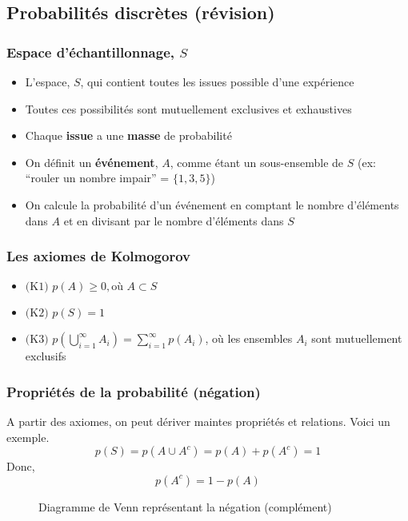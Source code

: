 \documentclass{beamer}
\begin{document}
\subsection{Probabilités discrètes (révision)}

\begin{frame}
    \frametitle{Espace d'échantillonnage, $S$}
    \begin{itemize}
      \item L'espace, $S$, qui contient toutes les issues possible d'une expérience
      \pause
      \item Toutes ces possibilités sont mutuellement exclusives et exhaustives
      \pause
      \item Chaque \textbf{issue} a une \textbf{masse} de probabilité
      \pause
      \item On définit un \textbf{événement}, $A$, comme étant un sous-ensemble de $S$ (ex: ``rouler un nombre impair'' = $\{1,3,5\}$)
      \pause
      \item On calcule la probabilité d'un événement en comptant le nombre d'éléments dans $A$ et en divisant par le nombre d'éléments dans $S$
    \end{itemize}
\end{frame}


\begin{frame}
    \frametitle{Les axiomes de Kolmogorov}
    \begin{itemize}
      \item $\textrm{(K1)} \, \, p(A) \geq 0, \textrm{où} \, \, A \subset S$
      \pause
      \item $\textrm{(K2)} \, \, p(S) = 1$
      \pause
      \item $\textrm{(K3)} \, \, p(\bigcup_{i=1}^{\infty} A_i) = \sum_{i=1}^{\infty} p(A_i)$, où les ensembles $A_i$ sont mutuellement exclusifs
    \end{itemize}
\end{frame}


\begin{frame}
    \frametitle{Propriétés de la probabilité (négation)}
    A partir des axiomes, on peut dériver maintes propriétés et relations. Voici un exemple.\\
    \pause
    \[p(S) = p(A \cup A^c) = p(A) + p(A^c) = 1\]
    \pause
    Donc,
    \[p(A^c) = 1 - p(A)\]
    \pause
    \begin{figure}
      \centering
      \scalebox{1}{}
      \caption{Diagramme de Venn représentant la négation (complément)}
    \end{figure}    
\end{frame}
\end{document}
